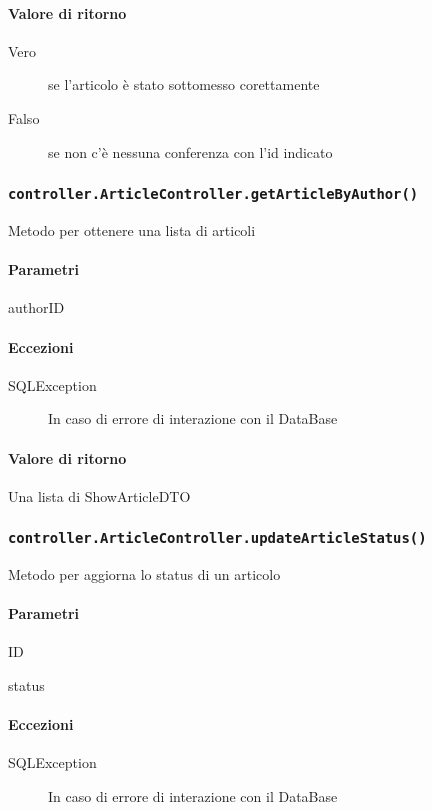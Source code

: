 \paragraph{Valore di ritorno}
\begin{description}
\item [Vero] se l'articolo è stato sottomesso corettamente
\item [Falso] se non c'è nessuna conferenza con l'id indicato
\end{description}

\subsubsection{\texttt{controller.ArticleController.getArticleByAuthor()}}
Metodo per ottenere una lista di articoli
\paragraph{Parametri}
\begin{description}
\item authorID
\end{description}
\paragraph{Eccezioni}
\begin{description}
\item[SQLException] In caso di errore di interazione con il DataBase
\end{description}
\paragraph{Valore di ritorno}
Una lista di ShowArticleDTO

\subsubsection{\texttt{controller.ArticleController.updateArticleStatus()}}
Metodo per aggiorna lo status di un articolo
\paragraph{Parametri}
\begin{description}
\item ID
\item status
\end{description}
\paragraph{Eccezioni}
\begin{description}
\item[SQLException] In caso di errore di interazione con il DataBase
\end{description}
